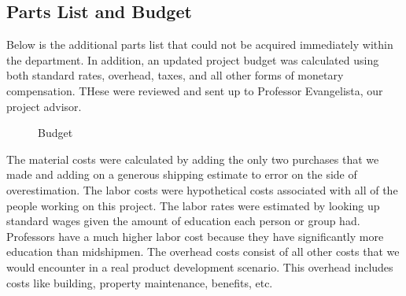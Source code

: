 \documentclass[10pt]{article}
\begin{document}
\subsection{Parts List and Budget}
Below is the additional parts list that could not be acquired immediately within the department. In addition, an updated project budget was calculated using both standard rates, overhead, taxes, and all other forms of monetary compensation. THese were reviewed and sent up to Professor Evangelista, our project advisor. 
%
%
%
%
%
%
%
%
%
%
%
%
%
%
%
%
%
%
%
%
%
%
%
%
%
%
%
%
%
%
%
%
%
%
%
%
%
%
%
%
%
%
%
%
%
%
%
%
%
%
%
%
%
%
%
%
%
%
%
%
%
%
%
%
%
%
%
%
%
%
%
%
%
%
%
%
%
%
%
%
%
%
%
%
%
%
%
%
%
%
%
%
%
%
%
%
%
%
%
%
%
%
%
%
%
%
%
%
%
%
%
%
%
%
%
%
%
%
%
%
%
%
%
%
%
%
%
%
%
%
%
%
%
%
%
%
%
%
%
%
%
%
%
%
%
%
%
%
%
%
%
\begin{figure}
\caption{Budget}
\label{fig:budget}
\end{figure}

The material costs were calculated  by adding the only two purchases that we made and adding on a generous shipping estimate to error on the side of overestimation.  The labor costs were hypothetical costs associated with all of the people working on this project.  The labor rates were estimated by looking up standard wages given the amount of education each person or group had.  Professors have a much higher labor cost because they have significantly more education than midshipmen.  The overhead costs consist of all other costs that we would encounter in a real product development scenario.  This overhead includes costs like building, property maintenance, benefits, etc.  
\end{document}
